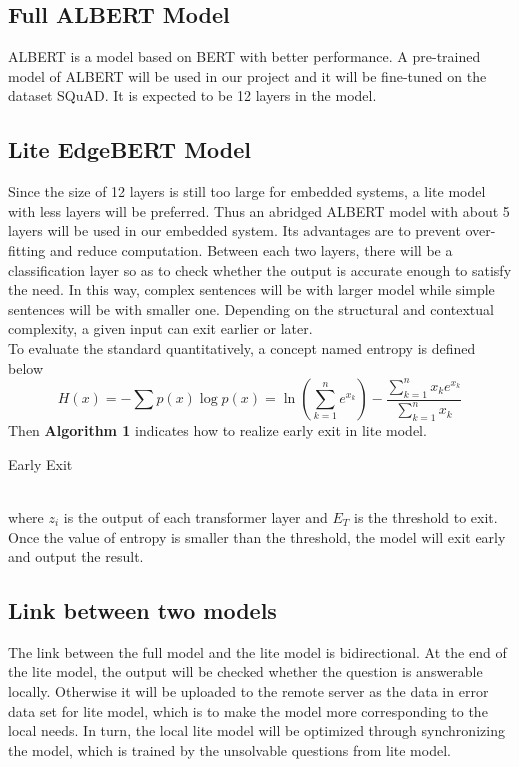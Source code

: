 \documentclass[a4paper]{article}
\begin{document}
\subsection{Full ALBERT Model}
ALBERT\cite{lan2020albert} is a model based on BERT with better performance. A pre-trained model of ALBERT\cite{lan2020albert} will be used in our project and it will be fine-tuned on the dataset SQuAD\cite{squad2.0}. It is expected to be 12 layers in the model.

\subsection{Lite EdgeBERT Model}
Since the size of 12 layers is still too large for embedded systems, a lite model with less layers will be preferred. Thus an abridged ALBERT model with about 5 layers will be used in our embedded system. Its advantages are to prevent over-fitting and reduce computation. Between each two layers, there will be a classification layer so as to check whether the output is accurate enough to satisfy the need. In this way, complex sentences will be with larger model while simple sentences will be with smaller one. Depending on the structural and contextual complexity, a given input can exit earlier or later. \\
To evaluate the standard quantitatively, a concept named entropy is defined below \cite{tambe2021edgebert}
\begin{equation}
H(x)=-\sum p(x)\log{p(x)}=\ln{(\sum^n_{k=1}e^{x_k})}-\frac{\sum^n_{k=1}x_k e^{x_k}}{\sum^n_{k=1}x_k}
\end{equation}
Then \textbf{Algorithm 1} indicates how to realize early exit in lite model.
\begin{algorithm}
\caption{Early Exit} 
\label{alg1}
\begin{algorithmic}
\ENDIF 
\ENDFOR
{} 
\ELSE
{}
\ENDIF 
\end{algorithmic}
\end{algorithm}\\
where $z_i$ is the output of each transformer layer and $E_T$ is the threshold to exit. Once the value of entropy is smaller than the threshold, the model will exit early and output the result.

\subsection{Link between two models}
The link between the full model and the lite model is bidirectional. At the end of the lite model, the output will be checked whether the question is answerable locally. Otherwise it will be uploaded to the remote server as the data in error data set for lite model, which is to make the model more corresponding to the local needs. In turn, the local lite model will be optimized through synchronizing the model, which is trained by the unsolvable questions from lite model.
\end{document}
